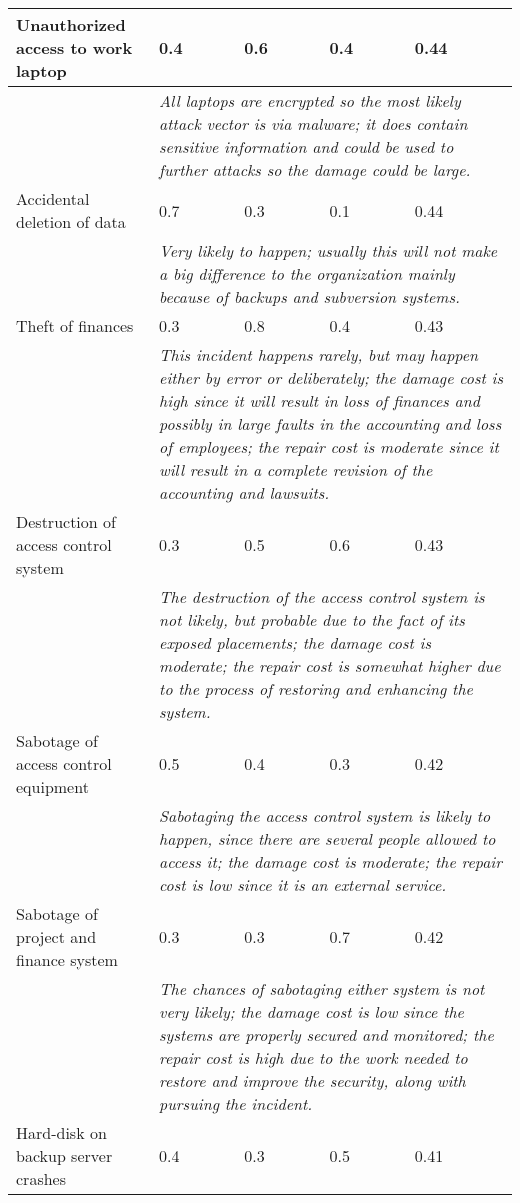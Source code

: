 \begin{longtable}{| p{4.2cm} | p{1.8cm} | p{1.8cm} | p{1.8cm} | p{1.8cm} |}
		Unauthorized access to work laptop & 0.4 & 0.6 & 0.4 & 0.44\\\hline
		& \multicolumn{4}{|p{8cm}|}{\textit{All laptops are encrypted so the most likely attack vector is via malware; it does contain sensitive information and could be used to further attacks so the damage could be large.}}\\\hline
		Accidental deletion of data & 0.7 & 0.3 & 0.1 & 0.44\\\hline
		& \multicolumn{4}{|p{8cm}|}{\textit{Very likely to happen; usually this will not make a big difference to the organization mainly because of backups and subversion systems.}}\\\hline
		Theft of finances & 0.3 & 0.8 & 0.4 & 0.43\\\hline
		& \multicolumn{4}{|p{8cm}|}{\textit{This incident happens rarely, but may happen either by error or deliberately; the damage cost is high since it will result in loss of finances and possibly in large faults in the accounting and loss of employees; the repair cost is moderate since it will result in a complete revision of the accounting and lawsuits.}}\\\hline
		Destruction of access control system & 0.3 & 0.5 & 0.6 & 0.43\\\hline
		& \multicolumn{4}{|p{8cm}|}{\textit{The destruction of the access control system is not likely, but probable due to the fact of its exposed placements; the damage cost is moderate; the repair cost is somewhat higher due to the process of restoring and enhancing the system.}}\\\hline
		Sabotage of access control equipment & 0.5 & 0.4 & 0.3 & 0.42\\\hline
		& \multicolumn{4}{|p{8cm}|}{\textit{Sabotaging the access control system is likely to happen, since there are several people allowed to access it; the damage cost is moderate; the repair cost is low since it is an external service.}}\\\hline
		Sabotage of project and finance system & 0.3 & 0.3 & 0.7 & 0.42\\\hline
		& \multicolumn{4}{|p{8cm}|}{\textit{The chances of sabotaging either system is not very likely; the damage cost is low since the systems are properly secured and monitored; the repair cost is high due to the work needed to restore and improve the security, along with pursuing the incident.}}\\\hline
		Hard-disk on backup server crashes & 0.4 & 0.3 & 0.5 & 0.41\\\hline

\end{longtable}

